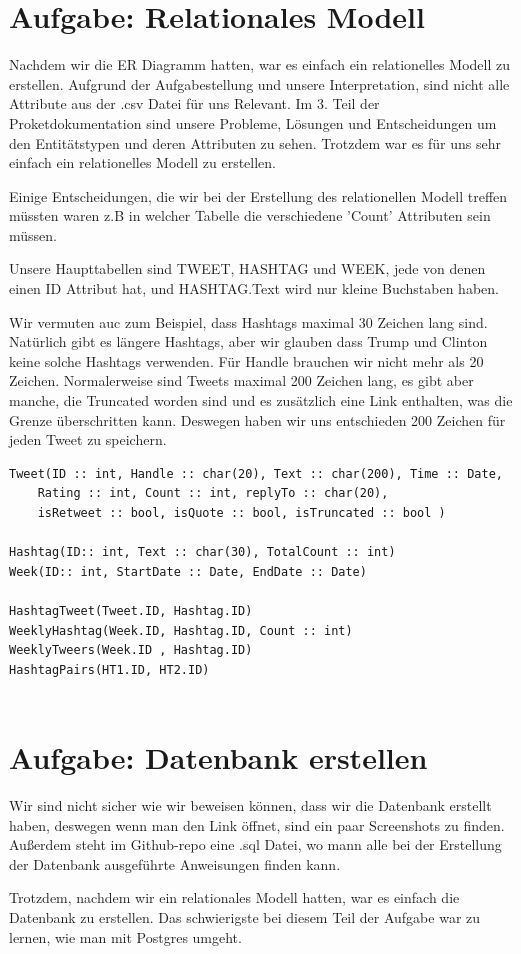 \section{Aufgabe: Relationales Modell}

Nachdem wir die ER Diagramm hatten, war es einfach ein relationelles Modell zu erstellen. Aufgrund der Aufgabestellung 
und unsere Interpretation, sind nicht alle Attribute aus der .csv Datei für uns Relevant. Im 3. Teil der Proketdokumentation
sind unsere Probleme, Lösungen und Entscheidungen um den Entitätstypen und deren Attributen zu sehen. Trotzdem war es 
für uns sehr einfach ein relationelles Modell zu erstellen.

Einige Entscheidungen, die wir bei der Erstellung des relationellen Modell treffen müssten waren z.B in welcher Tabelle die 
verschiedene 'Count' Attributen sein müssen.

Unsere Haupttabellen sind TWEET, HASHTAG und WEEK, jede von denen einen ID Attribut hat, und HASHTAG.Text wird nur kleine 
Buchstaben haben. 

Wir vermuten auc zum Beispiel, dass Hashtags maximal 30 Zeichen lang sind. Natürlich gibt es längere Hashtags, aber wir glauben 
dass Trump und Clinton keine solche Hashtags verwenden. Für Handle brauchen wir nicht mehr als 20 Zeichen. Normalerweise sind 
Tweets maximal 200 Zeichen lang, es gibt aber manche, die Truncated worden sind und es zusätzlich eine Link enthalten, was 
die Grenze überschritten kann. Deswegen haben wir uns entschieden 200 Zeichen für jeden Tweet zu speichern.

\begin{verbatim}
Tweet(ID :: int, Handle :: char(20), Text :: char(200), Time :: Date, 
    Rating :: int, Count :: int, replyTo :: char(20), 
    isRetweet :: bool, isQuote :: bool, isTruncated :: bool )
    
Hashtag(ID:: int, Text :: char(30), TotalCount :: int)
Week(ID:: int, StartDate :: Date, EndDate :: Date)

HashtagTweet(Tweet.ID, Hashtag.ID)
WeeklyHashtag(Week.ID, Hashtag.ID, Count :: int)
WeeklyTweers(Week.ID , Hashtag.ID)
HashtagPairs(HT1.ID, HT2.ID)


\end{verbatim}

\section{Aufgabe: Datenbank erstellen}
Wir sind nicht sicher wie wir beweisen können, dass wir die Datenbank erstellt haben, deswegen wenn man den Link öffnet, 
sind ein paar Screenshots zu finden. Außerdem steht im Github-repo eine .sql Datei, wo mann alle bei der Erstellung der Datenbank
ausgeführte Anweisungen finden kann. 

Trotzdem, nachdem wir ein relationales Modell hatten, war es einfach die Datenbank zu erstellen. Das schwierigste bei diesem Teil
der Aufgabe war zu lernen, wie man mit Postgres umgeht.

